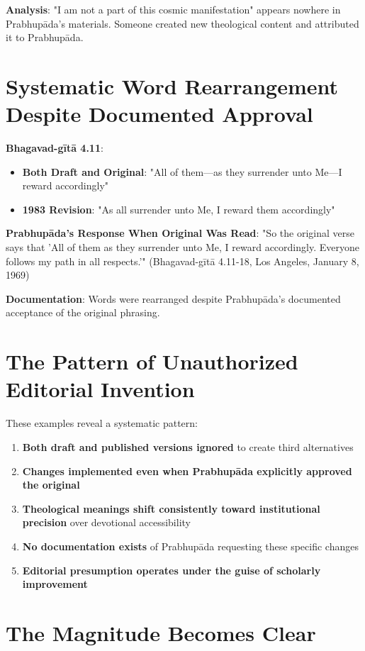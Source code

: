 \documentclass[11pt,twoside]{book}
\begin{document}
\textbf{\textbf{Analysis}}: "I am not a part of this cosmic manifestation" appears nowhere in Prabhupāda's materials. Someone created new theological content and attributed it to Prabhupāda.
\section*{Systematic Word Rearrangement Despite Documented Approval}
\label{sec:org19c203c}
\textbf{\textbf{Bhagavad-gītā 4.11}}:
\begin{itemize}
\item \textbf{\textbf{Both Draft and Original}}: "All of them—as they surrender unto Me—I reward accordingly"
\item \textbf{\textbf{1983 Revision}}: "As all surrender unto Me, I reward them accordingly"
\end{itemize}

\textbf{\textbf{Prabhupāda's Response When Original Was Read}}: "So the original verse says that 'All of them as they surrender unto Me, I reward accordingly. Everyone follows my path in all respects.'" (Bhagavad-gītā 4.11-18, Los Angeles, January 8, 1969)

\textbf{\textbf{Documentation}}: Words were rearranged despite Prabhupāda's documented acceptance of the original phrasing.
\section*{The Pattern of Unauthorized Editorial Invention}
\label{sec:orgce0adfa}

These examples reveal a systematic pattern:
\begin{enumerate}
\item \textbf{\textbf{Both draft and published versions ignored}} to create third alternatives
\item \textbf{\textbf{Changes implemented even when Prabhupāda explicitly approved the original}}
\item \textbf{\textbf{Theological meanings shift consistently toward institutional precision}} over devotional accessibility
\item \textbf{\textbf{No documentation exists}} of Prabhupāda requesting these specific changes
\item \textbf{\textbf{Editorial presumption operates under the guise of scholarly improvement}}
\end{enumerate}
\section*{The Magnitude Becomes Clear}
\label{sec:org08434ea}
\end{document}
